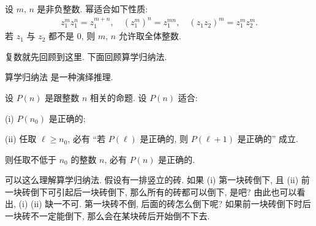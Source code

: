 \begin{proposition}
    设 $m$, $n$ 是非负整数. 幂适合如下性质:
    \begin{align*}
        z_1^m z_1^n = z_1^{m+n}, \quad (z_1^m)^n = z_1^{mn}, \quad (z_1 z_2)^m = z_1^m z_2^m.
    \end{align*}
    若 $z_1$ 与 $z_2$ 都不是 $0$, 则 $m$, $n$ 允许取全体整数.
\end{proposition}

复数就先回顾到这里. 下面回顾算学归纳法.

\begin{remark}
    算学归纳法  是一种演绎推理.
\end{remark}

\begin{proposition}
    设 $P(n)$ 是跟整数 $n$ 相关的命题. 设 $P(n)$ 适合:

    (i) $P(n_0)$ 是正确的;

    (ii) 任取 $\ell \geq n_0$, 必有 ``若 $P(\ell)$ 是正确的, 则 $P(\ell + 1)$ 是正确的'' 成立.

    则任取不低于 $n_0$ 的整数 $n$, 必有 $P(n)$ 是正确的.
\end{proposition}

\begin{remark}
    可以这么理解算学归纳法. 假设有一排竖立的砖. 如果 (i) 第一块砖倒下, 且 (ii) 前一块砖倒下可引起后一块砖倒下, 那么所有的砖都可以倒下, 是吧? 由此也可以看出, (i) (ii) 缺一不可. 第一块砖不倒, 后面的砖怎么倒下呢? 如果前一块砖倒下时后一块砖不一定能倒下, 那么会在某块砖后开始倒不下去.
\end{remark}

